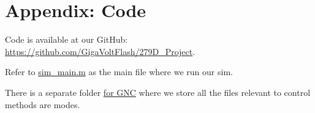 \appendix
\section{Appendix: Code}


Code is available at our GitHub: \href{https://github.com/GigaVoltFlash/279D_Project}{https://github.com/GigaVoltFlash/279D\_Project}.

Refer to \href{https://github.com/GigaVoltFlash/279D_Project/blob/main/sim/sim_main.m}{sim\_main.m} as the main file where we run our sim.

There is a separate folder \href{https://github.com/GigaVoltFlash/279D_Project/blob/main/gnc}{for GNC} where we store all the files relevant to control methods are modes.
